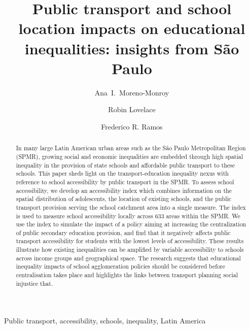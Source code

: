\documentclass[3p,authoryear,preprint,review,12pt]{elsarticle}
\begin{document}
\begin{frontmatter}
 \title{Public transport and school location impacts on educational inequalities: insights from São Paulo}
   
  \author[uab]{Ana~I.~Moreno-Monroy}
 
  \author[uol]{Robin Lovelace}
  
   \author[fgv]{Frederico R. Ramos}
  
 \address[urv]{Applied Economics Department, Autonomous University of Barcelona}
  \address[uol]{Intitute of Trasnport Studies, University of Leeds}
 \address[fgv]{CEPESP, Fundação Getulio Vargas}

\begin{abstract}
In many large Latin American urban areas such as the São Paulo
Metropolitan Region (SPMR), growing social and economic inequalities are embedded through high spatial inequality in the provision of state schools and affordable public transport to these schools. This paper sheds light on the transport-education inequality nexus with reference to school accessibility by public transport in the SPMR. 
To assess school accessibility, we develop an accessibility index which combines information on the spatial distribution of adolescents, the location of existing schools, and the public transport provision serving the school catchment area into a single measure. The index is used to measure school accessibility locally across 633 areas within the SPMR. We use the index to simulate the impact of a policy aiming at increasing the centralization of public secondary education provision, and find that it negatively affects public transport accessibility for students with the lowest levels of accessibility. These results illustrate how existing inequalities can be amplified by variable accessibility to schools across income groups and geographical space.
The research suggests that educational inequality impacts of school agglomeration policies should be considered before centralisation takes place and highlights the links between transport planning social injustice that.
\end{abstract}


\begin{keyword}
Public transport, accessibility, schools, inequality, Latin America\\
\end{keyword}

\end{frontmatter}
\end{document}
